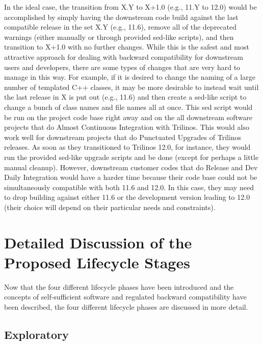 \documentclass[11pt]{SANDreport}
\begin{document}
In the ideal case, the transition from X.Y to X+1.0 (e.g., 11.Y to
12.0) would be accomplished by simply having the downstream code build
against the last compatible release in the set X.Y (e.g., 11.6),
remove all of the deprecated warnings (either manually or through
provided sed-like scripts), and then transition to X+1.0 with no
further changes.  While this is the safest and most attractive
approach for dealing with backward compatibility for downstream users
and developers, there are some types of changes that are very hard to
manage in this way.  For example, if it is desired to change the
naming of a large number of templated C++ classes, it may be more
desirable to instead wait until the last release in X is put out
(e.g., 11.6) and then create a sed-like script to change a bunch of
class names and file names all at once.  This sed script would be run
on the project code base right away and on the all downstream software
projects that do Almost Continuous Integration
{}\cite{SoftwareIntegrationforCSE09} with Trilinos.  This would also
work well for downstream projects that do Punctuated Upgrades
{}\cite{SoftwareIntegrationforCSE09} of Trilinos releases.  As soon as
they transitioned to Trilinos 12.0, for instance, they would run the
provided sed-like upgrade scripts and be done (except for perhaps a
little manual cleanup).  However, downstream customer codes that do
Release and Dev Daily Integration {}\cite{SoftwareIntegrationforCSE09}
would have a harder time because their code base could not be
simultaneously compatible with both 11.6 and 12.0.  In this case, they
may need to drop building against either 11.6 or the development
version leading to 12.0 (their choice will depend on their particular
needs and constraints).


%
{}\section{Detailed Discussion of the Proposed Lifecycle Stages}
\label{sec:detained_lifecycle_stages}
%

Now that the four different lifecycle phases have been introduced and
the concepts of self-sufficient software and regulated backward
compatibility have been described, the four different lifecycle phases
are discussed in more detail.


%
{}\subsection{Exploratory}
\label{sec:exploratory_code}
%
\end{document}
